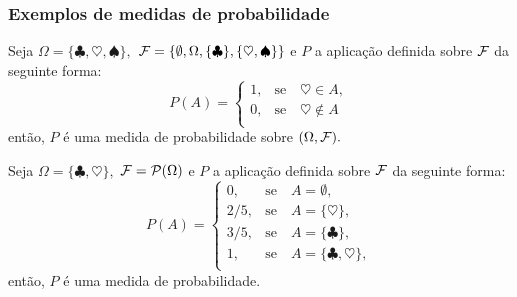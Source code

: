 \begin{frame}
\frametitle{Exemplos de medidas de probabilidade}
\begin{exem}
	Seja $\Omega=\{ \clubsuit,  \heartsuit, \spadesuit \},$ ${\cal F}= \{ \emptyset, \Omega, \{ \clubsuit \}, \{  \heartsuit, \spadesuit \}    \}$ e $P$ a aplicação
	definida sobre ${\cal F}$ da seguinte forma: 
	\begin{equation}
	\label{medp1}
	P(A)=
	\begin{cases}
	1, & \text{se} \quad \heartsuit \in A, \\
	0, & \text{se} \quad \heartsuit \notin A \\
	\end{cases}
	\end{equation}
	então, $P$ é uma medida de probabilidade sobre $(\Omega, {\cal F}).$
\end{exem}

\begin{exem}
	Seja $\Omega=\{ \clubsuit,  \heartsuit   \},$ ${\cal F}=\mathcal{P}(\Omega )$ e $P$ a aplicação
	definida sobre ${\cal F}$ da seguinte forma: 
	\begin{equation}
	\label{medp2}
	P(A)=
	\begin{cases}
	0, & \text{se} \quad A =\emptyset, \\
	2/5, & \text{se} \quad A =\{\heartsuit\}, \\
	3/5, & \text{se} \quad A =\{\clubsuit\}, \\
	1, & \text{se} \quad A =\{\clubsuit,  \heartsuit\}, \\
	\end{cases}
	\end{equation}
	então, $P$ é uma medida de probabilidade.
\end{exem}



\end{frame}


